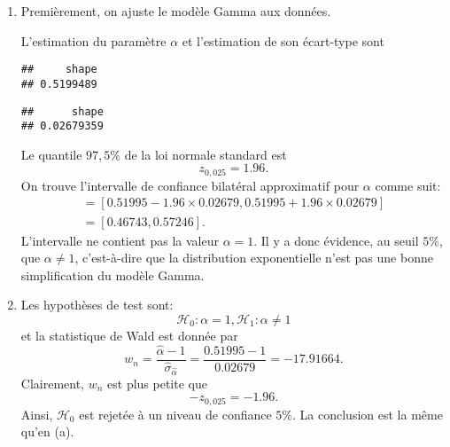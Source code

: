 \begin{solution}{6.11}
\begin{enumerate}
\item Premièrement, on ajuste le modèle Gamma aux données.
\begin{knitrout}
\color{fgcolor}\begin{kframe}
\begin{alltt}
 \hlkwb{<-} \hlstd{=}\hlstd{,}\hlstd{=}\hlstd{(}\hlstd{=}\hlstd{,}\hlstd{=}\hlstd{))}
\end{alltt}
\end{kframe}
\end{knitrout}
L'estimation du paramètre $\alpha$ et l'estimation de son écart-type sont
\begin{knitrout}
\color{fgcolor}\begin{kframe}
\begin{alltt}
\hlopt{$}\hlstd{estimate[}\hlstd{]}
\end{alltt}
\begin{verbatim}
##     shape
## 0.5199489
\end{verbatim}
\begin{alltt}
\hlopt{$}\hlstd{sd[}\hlstd{]}
\end{alltt}
\begin{verbatim}
##      shape
## 0.02679359
\end{verbatim}
\end{kframe}
\end{knitrout}
Le quantile $97,5$\% de la loi normale standard est
$$
z_{0,025} = 1.96.
$$
On trouve l'intervalle de confiance bilatéral approximatif pour $\alpha$ comme suit:
\begin{multline*}
[\hat \alpha - z_{0,025} \hat \sigma_{\hat \alpha}, \hat \alpha + z_{0,025} \hat \sigma_{\hat \alpha}] = [0.51995 - 1.96 \times 0.02679, 0.51995 + 1.96 \times 0.02679]\\
= [0.46743, 0.57246].
\end{multline*}
L'intervalle ne contient pas la valeur $\alpha=1$. Il y a donc évidence, au seuil $5$\%, que $\alpha \ne 1$, c'est-à-dire que la distribution exponentielle n'est pas une bonne simplification du modèle Gamma.

\item Les hypothèses de test sont:
$$
\mathcal{H}_0  :  \alpha = 1, \mathcal{H}_1 :  \alpha \ne 1
$$
et la statistique de Wald est donnée par
$$
w_n = \frac{\hat \alpha - 1}{\hat \sigma_{\hat \alpha}}  = \frac{0.51995-1}{0.02679} = -17.91664.
$$
Clairement, $w_n$ est plus petite que
$$
- z_{0,025} = -1.96.
$$
Ainsi, $\mathcal{H}_0$ est rejetée à un niveau de confiance $5$\%. La conclusion est la même qu'en (a).


\end{enumerate}
\end{solution}
